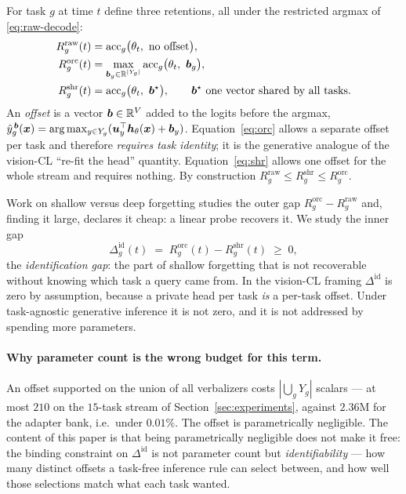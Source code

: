 For task $g$ at time $t$ define three retentions, all under the restricted argmax
of \eqref{eq:raw-decode}:
\begin{align}
  R_g^{\mathrm{raw}}(t) &= \mathrm{acc}_g\big(\theta_t,\ \text{no offset}\big),\\
  R_g^{\mathrm{orc}}(t) &= \max_{\bb_g\in\R^{|Y_g|}}
      \mathrm{acc}_g\big(\theta_t,\ \bb_g\big), \label{eq:orc}\\
  R_g^{\mathrm{shr}}(t) &= \mathrm{acc}_g\big(\theta_t,\ \bb^\star\big),
      \qquad \bb^\star \text{ one vector shared by all tasks}. \label{eq:shr}
\end{align}
An \emph{offset} is a vector $\bm{b}\in\mathbb{R}^V$ added to the logits before the argmax,
$\hat y_g^{\,\bm{b}}(\bm{x})=\arg\max_{y\in Y_g}(\bm{u}_y^\top\bm{h}_\theta(\bm{x})+\bm{b}_y)$.
Equation~\eqref{eq:orc} allows a separate offset per task and therefore
\emph{requires task identity}; it is the generative analogue of the vision-CL
``re-fit the head'' quantity. Equation~\eqref{eq:shr} allows one offset for the
whole stream and requires nothing. By construction
$R_g^{\mathrm{raw}}\le R_g^{\mathrm{shr}}\le R_g^{\mathrm{orc}}$.

Work on shallow versus deep forgetting studies the outer gap
$R_g^{\mathrm{orc}}-R_g^{\mathrm{raw}}$ and, finding it large, declares it cheap:
a linear probe recovers it. We study the inner gap
\begin{equation}
  \Delta_g^{\mathrm{id}}(t)\;=\;R_g^{\mathrm{orc}}(t)-R_g^{\mathrm{shr}}(t)\;\ge\;0,
  \label{eq:delta-id}
\end{equation}
the \emph{identification gap}: the part of shallow forgetting that is not
recoverable without knowing which task a query came from. In the vision-CL
framing $\Delta^{\mathrm{id}}$ is zero by assumption, because a private head per
task \emph{is} a per-task offset. Under task-agnostic generative inference it is
not zero, and it is not addressed by spending more parameters.

\paragraph{Why parameter count is the wrong budget for this term.}
An offset supported on the union of all verbalizers costs
$|\bigcup_g Y_g|$ scalars --- at most $210$ on the $15$-task stream of
Section~\ref{sec:experiments}, against $2.36$M for the adapter bank, i.e.\
under $0.01\%$. The offset is parametrically negligible. The content of this
paper is that being parametrically negligible does not make it free: the binding
constraint on $\Delta^{\mathrm{id}}$ is not parameter count but
\emph{identifiability} --- how many distinct offsets a task-free inference rule
can select between, and how well those selections match what each task wanted.

